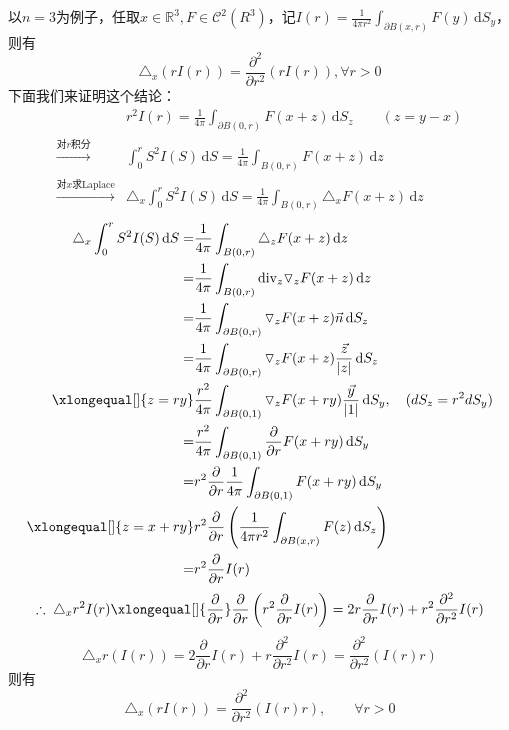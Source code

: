 \documentclass[11pt, a4paper]{article}
\theoremstyle{theorem}
\newcommand{\intd}[1]{\,\mathrm{d}{#1}}
\begin{document}
  以$n = 3$为例子，任取$x \in \mathbb{R}^3, F \in \mathcal{C}^2(R^3)$，记$I(r) = \frac{1}{4\pi r^2} \int_{\partial B(x,r)} F(y) \intd S_y$，则有
  $$
  \triangle_x(r I(r)) = \frac{\partial^2}{\partial r^2} (r I(r)), \forall r > 0
  $$
  下面我们来证明这个结论：
  \begin{align*}
      &r^2 I(r) = \frac{1}{4\pi} \int_{\partial B(0,r)} F(x+z) \intd S_z \quad \quad (z = y - x) \\
      \xrightarrow[]{\text{对}r\text{积分}} &\int_0^r S^2 I(S) \intd S = \frac{1}{4\pi} \int_{B(0,r)} F(x+z) \intd z \\
      \xrightarrow[]{\text{对}x\text{求Laplace}} &\triangle_x \int_0^r S^2 I(S) \intd S = \frac{1}{4 \pi} \int_{B(0,r)} \triangle_x F(x+z) \intd z
  \end{align*}
  \begin{align*}
      \triangle_x \int_0^r S^2 I(S) \intd S = &\frac{1}{4\pi} \int_{B(0,r)} \triangle_z F(x+z) \intd z \\
      = &\frac{1}{4\pi} \int_{B(0,r)} \text{div}_z \triangledown_z F(x+z) \intd z \\
      = &\frac{1}{4 \pi} \int_{\partial B(0,r)} \triangledown_z F(x+z) \vec{n} \intd S_z \\
      = &\frac{1}{4\pi} \int_{\partial B(0,r)} \triangledown_zF(x+z) \frac{\vec{z}}{|z|} \intd S_z \\
      \xlongequal[]{z=ry} &\frac{r^2}{4\pi} \int_{\partial B(0,1)}\triangledown_z F(x+ry) \frac{\vec{y}}{|1|} \intd S_y, \quad (dS_z = r^2 d S_y) \\
      = &\frac{r^2}{4\pi} \int_{\partial B(0,1)} \frac{\partial }{\partial r} F(x + ry) \intd S_y \\
      = &r^2 \frac{\partial }{\partial r} \frac{1}{4 \pi} \int_{\partial B(0,1)} F(x+ry) \intd S_y \\
      \xlongequal[]{z=x+ry} &r^2 \frac{\partial }{\partial r} \left(\frac{1}{4 \pi r^2} \int_{\partial B(x,r)} F(z) \intd S_z\right) \\
      = &r^2 \frac{\partial }{\partial r} I(r)
  \end{align*}
$$
\therefore \; \triangle_x r^2 I(r) \xlongequal[]{\frac{\partial}{\partial r}} \frac{\partial}{\partial r}\left(r^2 \frac{\partial}{\partial r}I(r)\right) = 2 r \frac{\partial}{\partial r} I(r) + r^2 \frac{\partial^2 }{\partial r^2} I(r)
$$
$$
\triangle_x r(I(r)) = 2\frac{\partial}{\partial r} I(r) + r \frac{\partial^2 }{\partial r^2} I(r) = \frac{\partial^2 }{\partial r^2} (I(r)r)
$$
则有
$$
\triangle_x (rI(r)) = \frac{\partial^2 }{\partial r^2} (I(r)r), \quad \quad \forall r > 0
$$
\end{document}
